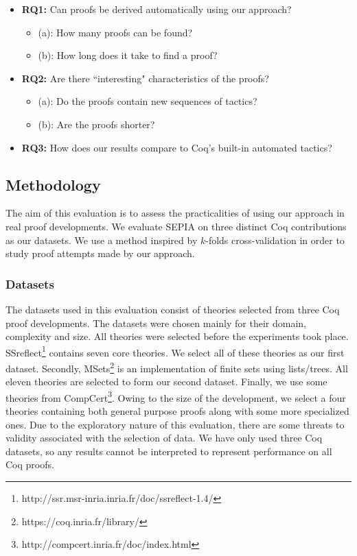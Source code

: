 \documentclass{llncs}
\begin{document}
\begin{itemize}
\item{{\bf RQ1: }Can proofs be derived automatically using our approach?}
\begin{itemize}
    \item (a): How many proofs can be found?
    \item (b): How long does it take to find a proof?
  \end{itemize}
\item{{\bf RQ2: }Are there ``interesting" characteristics of the proofs?}
\begin{itemize}
    \item (a): Do the proofs contain new sequences of tactics?
    \item (b): Are the proofs shorter?
  \end{itemize}
\item{{\bf RQ3: }How does our results compare to Coq's built-in automated tactics?}
\end{itemize}

\subsection{Methodology}
The aim of this evaluation is to assess the practicalities of using our approach in real proof developments. We evaluate SEPIA on three distinct Coq contributions as our datasets. We use a method inspired by $k$-folds cross-validation \cite{KohaviIJCAI} in order to study proof attempts made by our approach.

\vspace{-3mm}

\subsubsection{Datasets}
The datasets used in this evaluation consist of theories selected from three Coq proof developments. The datasets were chosen mainly for their domain, complexity and size. All theories were selected before the experiments took place. SSreflect\footnote{http://ssr.msr-inria.inria.fr/doc/ssreflect-1.4/} contains seven core theories. We select all of these theories as our first dataset. Secondly, MSets\footnote{https://coq.inria.fr/library/} is an implementation of finite sets using lists/trees. All eleven theories are selected to form our second dataset. Finally, we use some theories from CompCert\footnote{http://compcert.inria.fr/doc/index.html}. Owing to the size of the development, we select a four theories containing both general purpose proofs along with some more specialized ones. Due to the exploratory nature of this evaluation, there are some threats to validity associated with the selection of data. We have only used three Coq datasets, so any results cannot be interpreted to represent performance on all Coq proofs.
\end{document}
